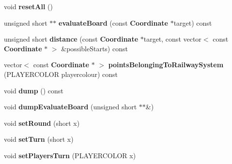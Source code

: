 \begin{DoxyCompactItemize}
\item 
void {\bfseries reset\-All} ()\label{class_state_ae3cf3d6f8fd90d8a59d53ccb1290a46c}

\item 
unsigned short $\ast$$\ast$ {\bfseries evaluate\-Board} (const {\bf Coordinate} $\ast$target) const \label{class_state_ae53ddb9f0ce4e7c94124bf3d809e7983}

\item 
unsigned short {\bfseries distance} (const {\bf Coordinate} $\ast$target, const vector$<$ const {\bf Coordinate} $\ast$ $>$ \&possible\-Starts) const \label{class_state_a4cb65e47fcc3f791c52cf75d904777d5}

\item 
vector$<$ const {\bf Coordinate} $\ast$ $>$ {\bfseries points\-Belonging\-To\-Railway\-System} (P\-L\-A\-Y\-E\-R\-C\-O\-L\-O\-R playercolour) const \label{class_state_aa2169b0cf7c5d5bcd680145f1f34a168}

\item 
void {\bfseries dump} () const \label{class_state_a27499f3070aef89461dbec0c99a24225}

\item 
void {\bfseries dump\-Evaluate\-Board} (unsigned short $\ast$$\ast$\&)\label{class_state_aabee39e9ef3cb3a93b878d6ea694d1f4}

\item 
void {\bfseries set\-Round} (short x)\label{class_state_a468eb35199b879f9df58245540ca849c}

\item 
void {\bfseries set\-Turn} (short x)\label{class_state_a5f8cd95cb039eb5333a9fed80b7efd2f}

\item 
void {\bfseries set\-Players\-Turn} (P\-L\-A\-Y\-E\-R\-C\-O\-L\-O\-R x)\label{class_state_a100c1959a9c60fdcd3400a3fda247588}

\end{DoxyCompactItemize}
